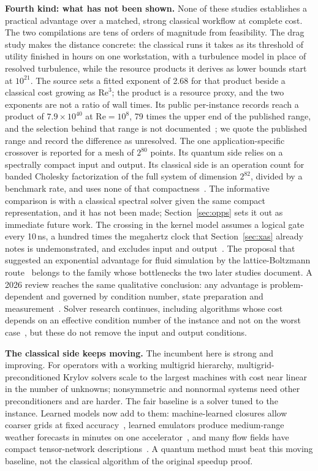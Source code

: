 \documentclass[10pt,a4paper]{article}
\begin{document}
\textbf{Fourth kind: what has not been shown.} None of these studies establishes a practical advantage over a matched, strong classical workflow at complete cost. The two compilations are tens of orders of magnitude from feasibility. The drag study makes the distance concrete: the classical runs it takes as its threshold of utility finished in hours on one workstation, with a turbulence model in place of resolved turbulence, while the resource products it derives as lower bounds start at $10^{21}$. The source sets a fitted exponent of 2.68 for that product beside a classical cost growing as $\mathrm{Re}^3$; the product is a resource proxy, and the two exponents are not a ratio of wall times. Its public per-instance records reach a product of $7.9\times10^{40}$ at $\mathrm{Re}=10^8$, 79 times the upper end of the published range, and the selection behind that range is not documented~\cite{qsub2025}; we quote the published range and record the difference as unresolved. The one application-specific crossover is reported for a mesh of $2^{80}$ points. Its quantum side relies on a spectrally compact input and output. Its classical side is an operation count for banded Cholesky factorization of the full system of dimension $2^{82}$, divided by a benchmark rate, and uses none of that compactness~\cite{zhuang2025}. The informative comparison is with a classical spectral solver given the same compact representation, and it has not been made; Section~\ref{sec:opps} sets it out as immediate future work. The crossing in the kernel model assumes a logical gate every 10\,ns, a hundred times the megahertz clock that Section~\ref{sec:xas} already notes is undemonstrated, and excludes input and output~\cite{tu2025}. The proposal that suggested an exponential advantage for fluid simulation by the lattice-Boltzmann route~\cite{li2025fluid} belongs to the family whose bottlenecks the two later studies document. A 2026 review reaches the same qualitative conclusion: any advantage is problem-dependent and governed by condition number, state preparation and measurement~\cite{cecile2026}. Solver research continues, including algorithms whose cost depends on an effective condition number of the instance and not on the worst case~\cite{dalzell2026}, but these do not remove the input and output conditions.

\textbf{The classical side keeps moving.} The incumbent here is strong and improving. For operators with a working multigrid hierarchy, multigrid-preconditioned Krylov solvers scale to the largest machines with cost near linear in the number of unknowns; nonsymmetric and nonnormal systems need other preconditioners and are harder. The fair baseline is a solver tuned to the instance. Learned models now add to them: machine-learned closures allow coarser grids at fixed accuracy~\cite{kochkov2021}, learned emulators produce medium-range weather forecasts in minutes on one accelerator~\cite{lam2023}, and many flow fields have compact tensor-network descriptions~\cite{mello2025}. A quantum method must beat this moving baseline, not the classical algorithm of the original speedup proof.
\end{document}
